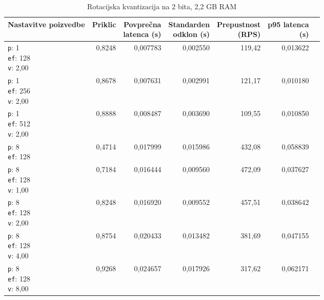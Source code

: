 \begin{table}[htbp]
  \centering
\small
  \caption{Rotacijska kvantizacija na 2 bita, 2,2 GB RAM}
  \label{tab:single-2cpu-2.2ram:tq2:qdrant-dipl-baseline-tenant-subgraph-tq2-ext-m16-ef-128-random-768-100-tenants-extended-upload-2026-08-18-12-08-12.json}
  \begin{tabularx}{\textwidth}{Xrrrrrr}
    \toprule
    Nastavitve poizvedbe & Priklic & \makecell{Povprečna\\latenca (s)} & \makecell{Standarden\\odklon (s)} & \makecell{Prepustnost\\(RPS)} & \makecell{p95 latenca\\(s)}  \\
    \midrule
    \makecell{\texttt{p}: 1\\\texttt{ef}: 128\\\texttt{v}: 2,00} & 0,8248 & 0,007783 & 0,002550 & 119,42 & 0,013622 \\
    \makecell{\texttt{p}: 1\\\texttt{ef}: 256\\\texttt{v}: 2,00} & 0,8678 & 0,007631 & 0,002991 & 121,17 & 0,010180 \\
    \makecell{\texttt{p}: 1\\\texttt{ef}: 512\\\texttt{v}: 2,00} & 0,8888 & 0,008487 & 0,003690 & 109,55 & 0,010850 \\
    \makecell{\texttt{p}: 8\\\texttt{ef}: 128} & 0,4714 & 0,017999 & 0,015986 & 432,08 & 0,058839 \\
    \makecell{\texttt{p}: 8\\\texttt{ef}: 128\\\texttt{v}: 1,00} & 0,7184 & 0,016444 & 0,009560 & 472,09 & 0,037627 \\
    \makecell{\texttt{p}: 8\\\texttt{ef}: 128\\\texttt{v}: 2,00} & 0,8248 & 0,016920 & 0,009552 & 457,51 & 0,038642 \\
    \makecell{\texttt{p}: 8\\\texttt{ef}: 128\\\texttt{v}: 4,00} & 0,8754 & 0,020433 & 0,013482 & 381,69 & 0,047155 \\
    \makecell{\texttt{p}: 8\\\texttt{ef}: 128\\\texttt{v}: 8,00} & 0,9268 & 0,024657 & 0,017926 & 317,62 & 0,062171 \\

\end{tabularx}
\end{table}
